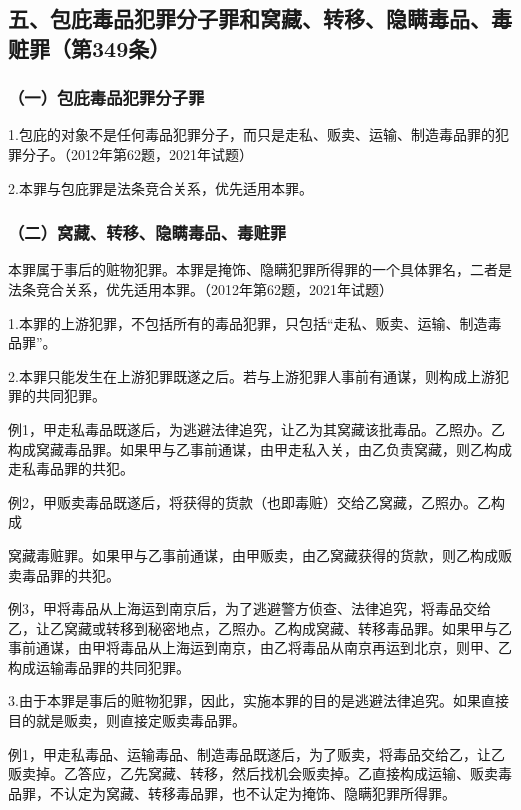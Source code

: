 \subsection*{五、包庇毒品犯罪分子罪和窝藏、转移、隐瞒毒品、毒赃罪（第349条）}

\subsubsection*{（一）包庇毒品犯罪分子罪}

1.包庇的对象不是任何毒品犯罪分子，而只是走私、贩卖、运输、制造毒品罪的犯罪分子。（2012年第62题，2021年试题）

2.本罪与包庇罪是法条竞合关系，优先适用本罪。

\subsubsection*{（二）窝藏、转移、隐瞒毒品、毒赃罪}

本罪属于事后的赃物犯罪。本罪是掩饰、隐瞒犯罪所得罪的一个具体罪名，二者是法条竞合关系，优先适用本罪。（2012年第62题，2021年试题）

1.本罪的上游犯罪，不包括所有的毒品犯罪，只包括“走私、贩卖、运输、制造毒品罪”。

2.本罪只能发生在上游犯罪既遂之后。若与上游犯罪人事前有通谋，则构成上游犯罪的共同犯罪。

例1，甲走私毒品既遂后，为逃避法律追究，让乙为其窝藏该批毒品。乙照办。乙构成窝藏毒品罪。如果甲与乙事前通谋，由甲走私入关，由乙负责窝藏，则乙构成走私毒品罪的共犯。

例2，甲贩卖毒品既遂后，将获得的货款（也即毒赃）交给乙窝藏，乙照办。乙构成

窝藏毒赃罪。如果甲与乙事前通谋，由甲贩卖，由乙窝藏获得的货款，则乙构成贩卖毒品罪的共犯。

例3，甲将毒品从上海运到南京后，为了逃避警方侦查、法律追究，将毒品交给乙，让乙窝藏或转移到秘密地点，乙照办。乙构成窝藏、转移毒品罪。如果甲与乙事前通谋，由甲将毒品从上海运到南京，由乙将毒品从南京再运到北京，则甲、乙构成运输毒品罪的共同犯罪。

3.由于本罪是事后的赃物犯罪，因此，实施本罪的目的是逃避法律追究。如果直接目的就是贩卖，则直接定贩卖毒品罪。

例1，甲走私毒品、运输毒品、制造毒品既遂后，为了贩卖，将毒品交给乙，让乙贩卖掉。乙答应，乙先窝藏、转移，然后找机会贩卖掉。乙直接构成运输、贩卖毒品罪，不认定为窝藏、转移毒品罪，也不认定为掩饰、隐瞒犯罪所得罪。

